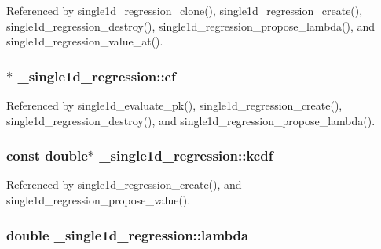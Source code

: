 Referenced by single1d\+\_\+regression\+\_\+clone(), single1d\+\_\+regression\+\_\+create(), single1d\+\_\+regression\+\_\+destroy(), single1d\+\_\+regression\+\_\+propose\+\_\+lambda(), and single1d\+\_\+regression\+\_\+value\+\_\+at().

\subsubsection[{\texorpdfstring{cf}{cf}}]{$\ast$ \+\_\+single1d\+\_\+regression\+::cf}\hypertarget{struct__single1d__regression_a5eb1a7192b56d0c48cfd1a98c0d60b8e}{}\label{struct__single1d__regression_a5eb1a7192b56d0c48cfd1a98c0d60b8e}


Referenced by single1d\+\_\+evaluate\+\_\+pk(), single1d\+\_\+regression\+\_\+create(), single1d\+\_\+regression\+\_\+destroy(), and single1d\+\_\+regression\+\_\+propose\+\_\+lambda().

\subsubsection[{\texorpdfstring{kcdf}{kcdf}}]{\setlength{\rightskip}{0pt plus 5cm}const double$\ast$ \+\_\+single1d\+\_\+regression\+::kcdf}\hypertarget{struct__single1d__regression_ac66bc857aec61ccf3095af2e41c1086b}{}\label{struct__single1d__regression_ac66bc857aec61ccf3095af2e41c1086b}


Referenced by single1d\+\_\+regression\+\_\+create(), and single1d\+\_\+regression\+\_\+propose\+\_\+value().

\subsubsection[{\texorpdfstring{lambda}{lambda}}]{\setlength{\rightskip}{0pt plus 5cm}double \+\_\+single1d\+\_\+regression\+::lambda}\hypertarget{struct__single1d__regression_a3140a1b24fcc23cab6ec66f588f86722}{}\label{struct__single1d__regression_a3140a1b24fcc23cab6ec66f588f86722}


